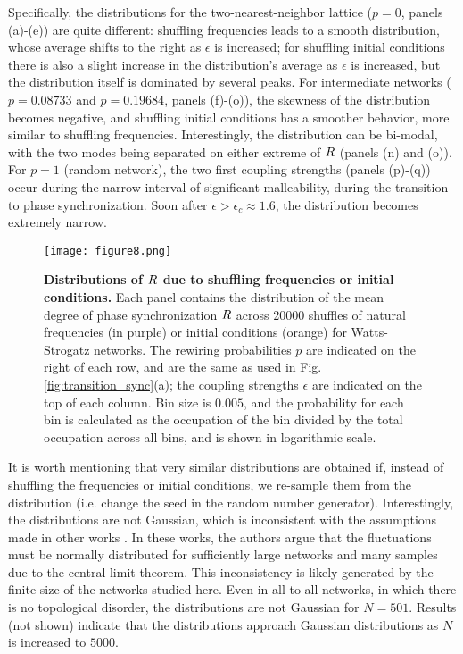 Specifically, the distributions for the two-nearest-neighbor lattice ($p = 0$, panels (a)-(e)) are quite different: shuffling frequencies leads to a smooth distribution, whose average shifts to the right as $\epsilon$ is increased; for shuffling initial conditions there is also a slight increase in the distribution's average as $\epsilon$ is increased, but the distribution itself is dominated by several peaks. 
For intermediate networks ($p = 0.08733$ and $p = 0.19684$, panels (f)-(o)), the skewness of the distribution becomes negative, and shuffling initial conditions has a smoother behavior, more similar to shuffling frequencies. Interestingly, the distribution can be bi-modal, with the two modes being separated on either extreme of $R$ (panels (n) and (o)). 
For $p = 1$ (random network), the two first coupling strengths (panels (p)-(q)) occur during the narrow interval of significant malleability, during the transition to phase synchronization. Soon after $\epsilon > \epsilon_c \approx 1.6$, the distribution becomes extremely narrow. 
%
\begin{figure*}[htb!]
    \centering
    \texttt{[image: figure8.png]}
    \caption{\textbf{Distributions of $R$ due to shuffling frequencies or initial conditions.} Each panel contains the distribution of the mean degree of phase synchronization $R$ across 20000 shuffles of natural frequencies (in purple) or initial conditions (orange) for Watts-Strogatz networks. The rewiring probabilities $p$ are indicated on the right of each row, and are the same as used in Fig. \ref{fig:transition_sync}(a); the coupling strengths $\epsilon$ are indicated on the top of each column. Bin size is $0.005$, and the probability for each bin is calculated as the occupation of the bin divided by the total occupation across all bins, and is shown in logarithmic scale.}
    \label{fig:Rdistributions}
\end{figure*}

It is worth mentioning that very similar distributions are obtained if, instead of shuffling the frequencies or initial conditions, we re-sample them from the distribution (i.e. change the seed in the random number generator).
Interestingly, the distributions are not Gaussian, which is inconsistent with the assumptions made in other works \cite{hong2007entrainment, hong2013link}. In these works, the authors argue that the fluctuations must be normally distributed for sufficiently large networks and many samples due to the central limit theorem. This inconsistency is likely generated by the finite size of the networks studied here. Even in all-to-all networks, in which there is no topological disorder, the distributions are not Gaussian for $N=501$. Results (not shown) indicate that the distributions approach Gaussian distributions as $N$ is increased to $5000$. 


